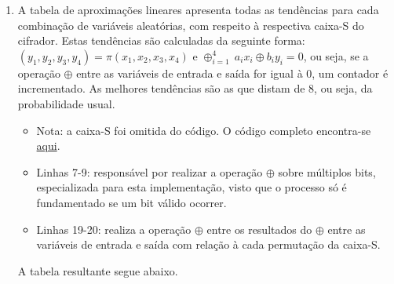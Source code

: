 \documentclass{article}
\begin{document}
\begin{enumerate}

    \item A tabela de aproximações lineares apresenta todas as tendências para
        cada combinação de variáveis aleatórias, com respeito à respectiva
        caixa-S do cifrador. Estas tendências são calculadas da seguinte
        forma: $(y_1, y_2, y_3, y_4) = \pi (x_1, x_2, x_3, x_4)$ e
        $\oplus^{4}_{i=1} \: a_{i}x_{i} \oplus b_{i}y_{i} = 0$, ou seja, se a
        operação $\oplus$ entre as variáveis de entrada e saída for igual à 0,
        um contador é incrementado. As melhores tendências são as que distam
        de 8, ou seja, da probabilidade usual.

    \begin{itemize}

        

        \item Nota: a caixa-S foi omitida do código. O código completo
            encontra-se
            \href{https://raw.githubusercontent.com/zambonin/UFSC-INE5451/master/modern/nl.py}{aqui}.

        \item Linhas 7-9: responsável por realizar a operação $\oplus$ sobre
            múltiplos bits, especializada para esta implementação, visto que o
            processo só é fundamentado se um bit válido ocorrer.

        \item Linhas 19-20: realiza a operação $\oplus$ entre os resultados do
            $\oplus$ entre as variáveis de entrada e saída com relação à cada
            permutação da caixa-S.

    \end{itemize}

    A tabela resultante segue abaixo. \vspace{2mm}


\end{enumerate}
\end{document}
